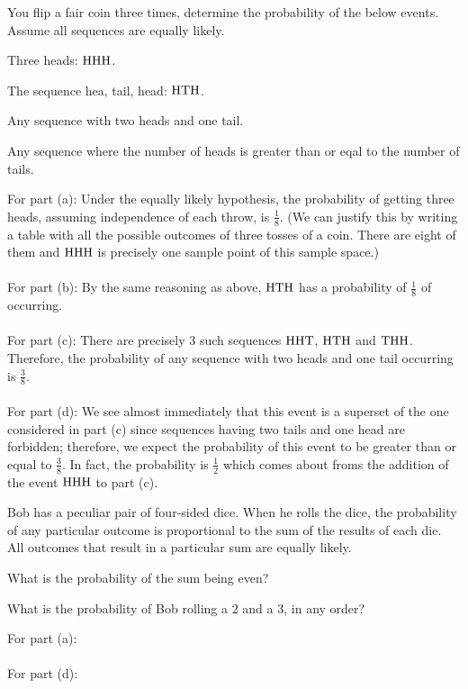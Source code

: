 \begin{problem}
  You flip a fair coin three times, determine the probability of the below
  events. Assume all sequences are equally likely.
  \begin{alphlist}
  \item Three heads: \(\mathrm{H}\mathrm{H}\mathrm{H}\).
  \item The sequence hea, tail, head: \(\mathrm{H}\mathrm{T}\mathrm{H}\).
  \item Any sequence with two heads and one tail.
  \item Any sequence where the number of heads is greater than or eqal to
    the number of tails.
  \end{alphlist}
\end{problem}
\begin{solution*}
  For part (a): Under the equally likely hypothesis, the probability of
  getting three heads, assuming independence of each throw, is
  \(\frac{1}{8}\). (We can justify this by writing a table with all the
  possible outcomes of three tosses of a coin. There are eight of them and
  \(\mathrm{H}\mathrm{H}\mathrm{H}\) is precisely one sample point of this sample space.)
  \\\\
  For part (b): By the same reasoning as above, \(\mathrm{H}\mathrm{T}\mathrm{H}\) has a
  probability of \(\frac{1}{8}\) of occurring.
  \\\\
  For part (c): There are precisely \(3\) such sequences \(\mathrm{H}\mathrm{H}\mathrm{T}\),
  \(\mathrm{H}\mathrm{T}\mathrm{H}\) and \(\mathrm{T}\mathrm{H}\mathrm{H}\). Therefore, the probability of any
  sequence with two heads and one tail occurring is \(\frac{3}{8}\).
  \\\\
  For part (d): We see almost immediately that this event is a superset of
  the one considered in part (c) since sequences having two tails and one
  head are forbidden; therefore, we expect the probability of this event to
  be greater than or equal to \(\frac{3}{8}\). In fact, the probability is
  \(\frac{1}{2}\) which comes about froms the addition of the event
  \(\mathrm{H}\mathrm{H}\mathrm{H}\) to part (c).
\end{solution*}

\begin{problem}
  Bob has a peculiar pair of four-sided dice. When he rolls the dice, the
  probability of any particular outcome is proportional to the sum of the
  results of each die. All outcomes that result in a particular sum are
  equally likely.
  \begin{alphlist}
  \item What is the probability of the sum being even?
  \item What is the probability of Bob rolling a \(2\) and a \(3\), in any
    order?
  \end{alphlist}
\end{problem}
\begin{solution*}
  For part (a):
  \\\\
  For part (d):
\end{solution*}

